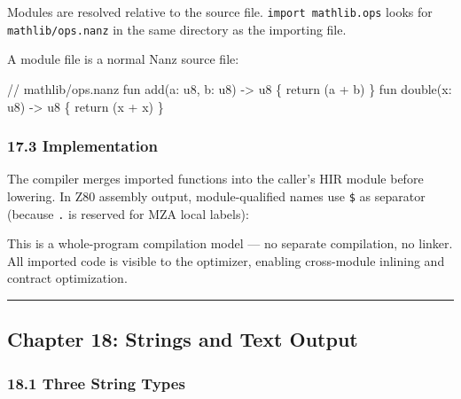 \documentclass[
  11pt,
]{article}
\newenvironment{Shaded}{\begin{snugshade}}{\end{snugshade}}
\newcommand{\BuiltInTok}[1]{#1}
\newcommand{\CommentTok}[1]{\textcolor[rgb]{0.56,0.35,0.01}{\textit{#1}}}
\newcommand{\ControlFlowTok}[1]{\textcolor[rgb]{0.13,0.29,0.53}{\textbf{#1}}}
\newcommand{\NormalTok}[1]{#1}
\newcommand{\OperatorTok}[1]{\textcolor[rgb]{0.81,0.36,0.00}{\textbf{#1}}}
\begin{document}
Modules are resolved relative to the source file.
\texttt{import\ mathlib.ops} looks for \texttt{mathlib/ops.nanz} in the
same directory as the importing file.

A module file is a normal Nanz source file:

\begin{Shaded}
\begin{Highlighting}[]
\NormalTok{// mathlib/ops.nanz}
\NormalTok{fun add(a: u8, b: u8) {-}\textgreater{} u8 \{ return (a + b) \}}
\NormalTok{fun double(x: u8) {-}\textgreater{} u8 \{ return (x + x) \}}
\end{Highlighting}
\end{Shaded}

\hypertarget{implementation}{%
\subsubsection{17.3 Implementation}\label{implementation}}

The compiler merges imported functions into the caller's HIR module
before lowering. In Z80 assembly output, module-qualified names use
\texttt{\$} as separator (because \texttt{.} is reserved for MZA local
labels):

\begin{Shaded}
\end{Shaded}

This is a whole-program compilation model --- no separate compilation,
no linker. All imported code is visible to the optimizer, enabling
cross-module inlining and contract optimization.

\begin{center}\rule{0.5\linewidth}{0.5pt}\end{center}

\hypertarget{chapter-18-strings-and-text-output}{%
\subsection{Chapter 18: Strings and Text
Output}\label{chapter-18-strings-and-text-output}}

\hypertarget{three-string-types}{%
\subsubsection{18.1 Three String Types}\label{three-string-types}}
\end{document}
